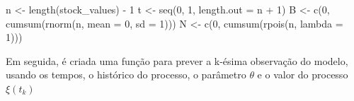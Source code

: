 \documentclass[
  letterpaper,
  DIV=11,
  numbers=noendperiod]{scrreprt}
\newenvironment{Shaded}{\begin{snugshade}}{\end{snugshade}}
\newcommand{\AttributeTok}[1]{\textcolor[rgb]{0.40,0.45,0.13}{#1}}
\newcommand{\DecValTok}[1]{\textcolor[rgb]{0.68,0.00,0.00}{#1}}
\newcommand{\FunctionTok}[1]{\textcolor[rgb]{0.28,0.35,0.67}{#1}}
\newcommand{\NormalTok}[1]{\textcolor[rgb]{0.00,0.23,0.31}{#1}}
\newcommand{\OtherTok}[1]{\textcolor[rgb]{0.00,0.23,0.31}{#1}}
\newcommand{\SpecialCharTok}[1]{\textcolor[rgb]{0.37,0.37,0.37}{#1}}
\begin{document}
\begin{Shaded}
\begin{Highlighting}[]
\NormalTok{n }\OtherTok{\textless{}{-}} \FunctionTok{length}\NormalTok{(stock\_values) }\SpecialCharTok{{-}} \DecValTok{1}
\NormalTok{t }\OtherTok{\textless{}{-}} \FunctionTok{seq}\NormalTok{(}\DecValTok{0}\NormalTok{, }\DecValTok{1}\NormalTok{, }\AttributeTok{length.out =}\NormalTok{ n }\SpecialCharTok{+} \DecValTok{1}\NormalTok{)}
\NormalTok{B }\OtherTok{\textless{}{-}} \FunctionTok{c}\NormalTok{(}\DecValTok{0}\NormalTok{, }\FunctionTok{cumsum}\NormalTok{(}\FunctionTok{rnorm}\NormalTok{(n, }\AttributeTok{mean =} \DecValTok{0}\NormalTok{, }\AttributeTok{sd =} \DecValTok{1}\NormalTok{)))}
\NormalTok{N }\OtherTok{\textless{}{-}} \FunctionTok{c}\NormalTok{(}\DecValTok{0}\NormalTok{, }\FunctionTok{cumsum}\NormalTok{(}\FunctionTok{rpois}\NormalTok{(n, }\AttributeTok{lambda =} \DecValTok{1}\NormalTok{)))}
\end{Highlighting}
\end{Shaded}

Em seguida, é criada uma função para prever a k-ésima observação do
modelo, usando os tempos, o histórico do processo, o parâmetro
\(\theta\) e o valor do processo \(\xi(t_{k})\)
\end{document}
